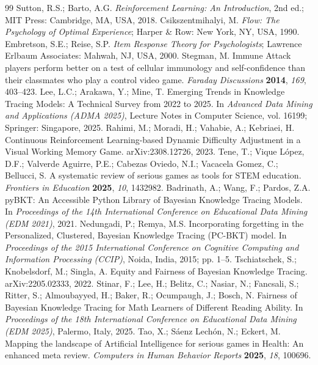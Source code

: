\documentclass[11pt]{article}
\begin{document}
\begin{thebibliography}{99}
 Sutton, R.S.; Barto, A.G. \textit{Reinforcement Learning: An Introduction}, 2nd ed.; MIT Press: Cambridge, MA, USA, 2018.
 Csikszentmihalyi, M. \textit{Flow: The Psychology of Optimal Experience}; Harper \& Row: New York, NY, USA, 1990.
 Embretson, S.E.; Reise, S.P. \textit{Item Response Theory for Psychologists}; Lawrence Erlbaum Associates: Mahwah, NJ, USA, 2000.
 Stegman, M. Immune Attack players perform better on a test of cellular immunology and self-confidence than their classmates who play a control video game. \textit{Faraday Discussions} \textbf{2014}, \textit{169}, 403--423.
 Lee, L.C.; Arakawa, Y.; Mine, T. Emerging Trends in Knowledge Tracing Models: A Technical Survey from 2022 to 2025. In \textit{Advanced Data Mining and Applications (ADMA 2025)}, Lecture Notes in Computer Science, vol. 16199; Springer: Singapore, 2025.
 Rahimi, M.; Moradi, H.; Vahabie, A.; Kebriaei, H. Continuous Reinforcement Learning-based Dynamic Difficulty Adjustment in a Visual Working Memory Game. arXiv:2308.12726, 2023.
 Tene, T.; Vique L\'opez, D.F.; Valverde Aguirre, P.E.; Cabezas Oviedo, N.I.; Vacacela Gomez, C.; Bellucci, S. A systematic review of serious games as tools for STEM education. \textit{Frontiers in Education} \textbf{2025}, \textit{10}, 1432982.
 Badrinath, A.; Wang, F.; Pardos, Z.A. pyBKT: An Accessible Python Library of Bayesian Knowledge Tracing Models. In \textit{Proceedings of the 14th International Conference on Educational Data Mining (EDM 2021)}, 2021.
 Nedungadi, P.; Remya, M.S. Incorporating forgetting in the Personalized, Clustered, Bayesian Knowledge Tracing (PC-BKT) model. In \textit{Proceedings of the 2015 International Conference on Cognitive Computing and Information Processing (CCIP)}, Noida, India, 2015; pp. 1--5.
 Tschiatschek, S.; Knobelsdorf, M.; Singla, A. Equity and Fairness of Bayesian Knowledge Tracing. arXiv:2205.02333, 2022.
 Stinar, F.; Lee, H.; Belitz, C.; Nasiar, N.; Fancsali, S.; Ritter, S.; Almoubayyed, H.; Baker, R.; Ocumpaugh, J.; Bosch, N. Fairness of Bayesian Knowledge Tracing for Math Learners of Different Reading Ability. In \textit{Proceedings of the 18th International Conference on Educational Data Mining (EDM 2025)}, Palermo, Italy, 2025.
 Tao, X.; S\'aenz Lech\'on, N.; Eckert, M. Mapping the landscape of Artificial Intelligence for serious games in Health: An enhanced meta review. \textit{Computers in Human Behavior Reports} \textbf{2025}, \textit{18}, 100696.

\end{thebibliography}
\end{document}
